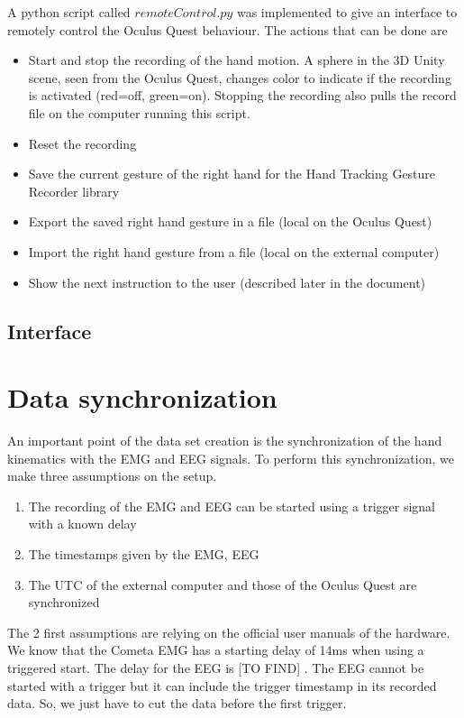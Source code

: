 \documentclass{article}
\begin{document}
A python script called $remoteControl.py$ was implemented to give an interface to remotely control the Oculus Quest behaviour. The actions that can be done are
\begin{itemize}
    \item Start and stop the recording of the hand motion. A sphere in the 3D Unity scene, seen from the Oculus Quest, changes color to indicate if the recording is activated (red=off, green=on). Stopping the recording also pulls the record file on the computer running this script.
    \item Reset the recording
    \item Save the current gesture of the right hand for the Hand Tracking Gesture  Recorder library
    \item Export the saved right hand gesture in a file (local on the Oculus Quest)
    \item Import the right hand gesture from a file (local on the external computer)
    \item Show the next instruction to the user (described later in the document)
\end{itemize}

\subsection{Interface}




\section{Data synchronization}

An important point of the data set creation is the synchronization of the hand kinematics with the EMG and EEG signals. To perform this synchronization, we make three assumptions on the setup.
\begin{enumerate}
    \item The recording of the EMG and EEG can be started using a trigger signal with a known delay
    \item The timestamps given by the EMG, EEG
    \item The UTC of the external computer and those of the Oculus Quest are synchronized
\end{enumerate}
The 2 first assumptions are relying on the official user manuals of the hardware. We know that the Cometa EMG has a starting delay of 14ms when using a triggered start. The delay for the EEG is \color{red} [TO FIND] \color{black}. The EEG cannot be started with a trigger but it can include the trigger timestamp in its recorded data. So, we just have to cut the data before the first trigger.
\end{document}
